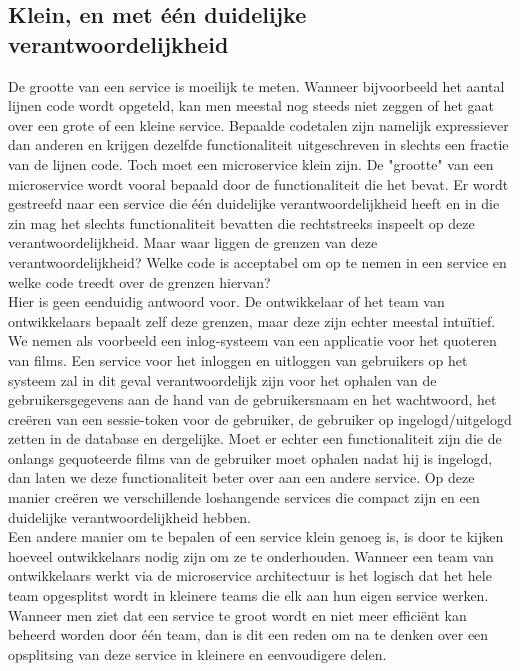 \subsection{Klein, en met één duidelijke verantwoordelijkheid}
\label{subsec:klein}
De grootte van een service is moeilijk te meten. Wanneer bijvoorbeeld het aantal lijnen code wordt opgeteld, kan men meestal nog steeds niet zeggen of het gaat over een grote of een kleine service. Bepaalde codetalen zijn namelijk expressiever dan anderen en krijgen dezelfde functionaliteit uitgeschreven in slechts een fractie van de lijnen code. Toch moet een microservice klein zijn. De "grootte" van een microservice wordt vooral bepaald door de functionaliteit die het bevat. Er wordt gestreefd naar een service die één duidelijke verantwoordelijkheid heeft en in die zin mag het slechts functionaliteit bevatten die rechtstreeks inspeelt op deze verantwoordelijkheid. Maar waar liggen de grenzen van deze verantwoordelijkheid? Welke code is acceptabel om op te nemen in een service en welke code treedt over de grenzen hiervan?
\\
Hier is geen eenduidig antwoord voor. De ontwikkelaar of het team van ontwikkelaars bepaalt zelf deze grenzen, maar deze zijn echter meestal intuïtief. We nemen als voorbeeld een inlog-systeem van een applicatie voor het quoteren van films. Een service voor het inloggen en uitloggen van gebruikers op het systeem zal in dit geval verantwoordelijk zijn voor het ophalen van de gebruikersgegevens aan de hand van de gebruikersnaam en het wachtwoord, het creëren van een sessie-token voor de gebruiker, de gebruiker op ingelogd/uitgelogd zetten in de database en dergelijke. Moet er echter een functionaliteit zijn die de onlangs gequoteerde films van de gebruiker moet ophalen nadat hij is ingelogd, dan laten we deze functionaliteit beter over aan een andere service. Op deze manier creëren we verschillende loshangende services die compact zijn en een duidelijke verantwoordelijkheid hebben.
\\
Een andere manier om te bepalen of een service klein genoeg is, is door te kijken hoeveel ontwikkelaars nodig zijn om ze te onderhouden. Wanneer een team van ontwikkelaars werkt via de microservice architectuur is het logisch dat het hele team opgesplitst wordt in kleinere teams die elk aan hun eigen service werken. Wanneer men ziet dat een service te groot wordt en niet meer efficiënt kan beheerd worden door één team, dan is dit een reden om na te denken over een opsplitsing van deze service in kleinere en eenvoudigere delen.
\\
\\
